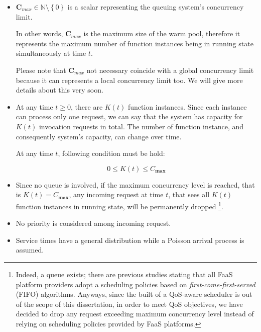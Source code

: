 \documentclass[12pt,a4paper]{report}
\newcommand{\N}{\mathbb{N}}
\begin{document}
\begin{itemize}
	
	\item $\textbf{C}_{max} \in \N \setminus \left\{0\right\}$ is a scalar representing the queuing system's concurrency limit.
	
	In other words, $\textbf{C}_{max}$ is the maximum size of the warm pool, therefore it represents the maximum number of function instances being in running state simultaneously at time $t$. 
	
	Please note that $\textbf{C}_{max}$ not necessary coincide with a global concurrency limit because it can represents a local concurrency limit too. We will give more details about this very soon.
	
	\item At any time $t \geq 0$, there are $K(t)$ function instances. Since each instance can process only one request, we can say that the system has capacity for $K(t)$ invocation requests in total. The number of function instance, and consequently system's capacity, can change over time. 
	
	At any time $t$, following condition must be hold:
	
	\begin{equation}
		0 \leq K(t) \leq {C}_{\textbf{max}}
	\end{equation}
	
	\item Since no queue is involved, if the maximum concurrency level is reached, that is $K(t) = {C}_{\textbf{max}}$, any incoming request at time $t$, that sees all $K(t)$ function instances in running state, will be permanently dropped \footnote{Indeed, a queue exists; there are previous studies stating that all FaaS platform providers adopt a scheduling policies based on \textit{first-come-first-served} (FIFO) algorithms. Anyways, since the built of a QoS-aware scheduler is out of the scope of this dissertation, in order to meet QoS objectives, we have decided to drop any request exceeding maximum concurrency level instead of relying on scheduling policies provided by FaaS platforms.}.
	
	\item No priority is considered among incoming request.
	
	\item Service times have a general distribution while a Poisson arrival process is assumed.
\end{itemize} 
\end{document}
